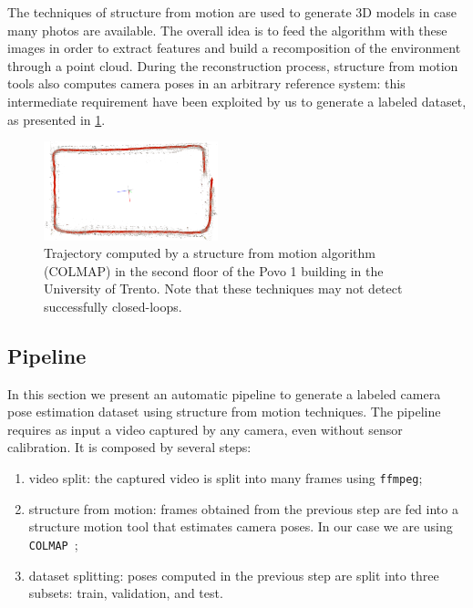 The techniques of structure from motion are used to generate 3D models in case many photos are available. The overall idea is to feed the algorithm with these images in order to extract features and build a recomposition of the environment through a point cloud.
During the reconstruction process, structure from motion tools also computes camera poses in an arbitrary reference system: this intermediate requirement have been exploited by us to generate a labeled dataset, as presented in \cref{fig:trajectory-colmap}.

\begin{figure}[htbp]
    \begin{center}
        \includegraphics[width=0.45\textwidth]{./imgs/trajectory_colmap.png}
    \end{center}
    \caption{Trajectory computed by a structure from motion algorithm (COLMAP) in the second floor of the Povo 1 building in the University of Trento. Note that these techniques may not detect successfully closed-loops.}
    \label{fig:trajectory-colmap}
\end{figure}

\subsection{Pipeline}
In this section we present an automatic pipeline to generate a labeled camera pose estimation dataset using structure from motion techniques. The pipeline requires as input a video captured by any camera, even without sensor calibration. It is composed by several steps:
\begin{enumerate}
    \item video split: the captured video is split into many frames using \texttt{ffmpeg};
    \item structure from motion: frames obtained from the previous step are fed into a structure motion tool that estimates camera poses. In our case we are using \texttt{COLMAP}~\cite{colmap};
    \item dataset splitting: poses computed in the previous step are split into three subsets: train, validation, and test.
\end{enumerate}

